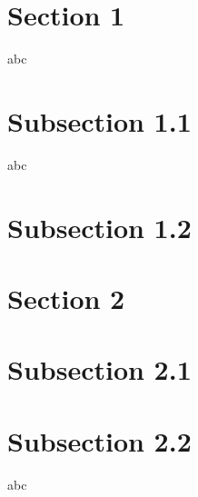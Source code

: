 \documentclass{beamer}
\begin{document}
\section{Section 1}

\begin{frame}
    abc
\end{frame} 


\section{Subsection 1.1}

\begin{frame}
    abc
\end{frame} 

\section{Subsection 1.2}

\section{Section 2}

\section{Subsection 2.1}

\section{Subsection 2.2}

\begin{frame}
    abc
\end{frame} 
\end{document}

